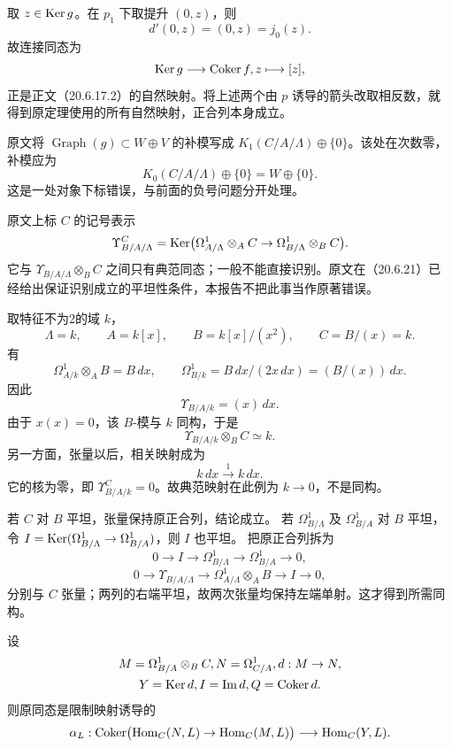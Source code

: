 取 $z\in\operatorname{Ker} g$。在 $p_1$ 下取提升 $(0,z)$，则
\[
 d'(0,z)=(0,z)=j_0(z).
\]
故连接同态为
\[
 \operatorname{Ker} g\longrightarrow\operatorname{Coker} f, z\longmapsto[z],
\]
正是正文（20.6.17.2）的自然映射。将上述两个由 $p$ 诱导的箭头改取相反数，就得到原定理使用的所有自然映射，正合列本身成立。

原文将 $\operatorname{Graph}(g)\subset W\oplus V$ 的补模写成
$K_1(C/A/\Lambda)\oplus\{0\}$。该处在次数零，补模应为
\[
 K_0(C/A/\Lambda)\oplus\{0\}=W\oplus\{0\}.
\]
这是一处对象下标错误，与前面的负号问题分开处理。

原文上标 $C$ 的记号表示
\[
 \Upsilon^C_{B/A/\Lambda}
 =\operatorname{Ker}\bigl(\Omega^1_{A/\Lambda}\otimes_A C
       \to\Omega^1_{B/\Lambda}\otimes_B C\bigr).
\]
它与 $\Upsilon_{B/A/\Lambda}\otimes_B C$ 之间只有典范同态；一般不能直接识别。原文在（20.6.21）已经给出保证识别成立的平坦性条件，本报告不把此事当作原著错误。

取特征不为2的域 $k$，
\[
 \Lambda=k,\qquad A=k[x],\qquad B=k[x]/(x^2),\qquad
 C=B/(x)=k .
\]
有
\[
 \Omega^1_{A/k}\otimes_A B=B\,dx,\qquad
 \Omega^1_{B/k}=B\,dx/(2x\,dx)=(B/(x))\,dx .
\]
因此
\[
 \Upsilon_{B/A/k}=(x)\,dx .
\]
由于 $x(x)=0$，该 $B$-模与 $k$ 同构，于是
\[
 \Upsilon_{B/A/k}\otimes_B C\simeq k.
\]
另一方面，张量以后，相关映射成为
\[
 k\,dx\xrightarrow{\ 1\ } k\,dx .
\]
它的核为零，即 $\Upsilon^C_{B/A/k}=0$。故典范映射在此例为
$k\to0$，不是同构。

若 $C$ 对 $B$ 平坦，张量保持原正合列，结论成立。
若 $\Omega^1_{B/\Lambda}$ 及 $\Omega^1_{B/A}$ 对 $B$ 平坦，
令 $I=\operatorname{Ker}(\Omega^1_{B/\Lambda}\to\Omega^1_{B/A})$，则 $I$ 也平坦。
把原正合列拆为
\[
0\to I\to\Omega^1_{B/\Lambda}\to\Omega^1_{B/A}\to0,
\]
\[
0\to\Upsilon_{B/A/\Lambda}\to\Omega^1_{A/\Lambda}\otimes_A B\to I\to0,
\]
分别与 $C$ 张量；两列的右端平坦，故两次张量均保持左端单射。这才得到所需同构。

设
\[
\begin{gathered}
 M=\Omega^1_{B/A}\otimes_B C, N=\Omega^1_{C/A}, d:M\to N,\\
 Y=\operatorname{Ker} d, I=\operatorname{Im} d, Q=\operatorname{Coker} d.
\end{gathered}
\]
则原同态是限制映射诱导的
\[
 \alpha_L:\operatorname{Coker}\bigl(\operatorname{Hom}_C(N,L)\to\operatorname{Hom}_C(M,L)\bigr)
 \longrightarrow\operatorname{Hom}_C(Y,L).
\]

